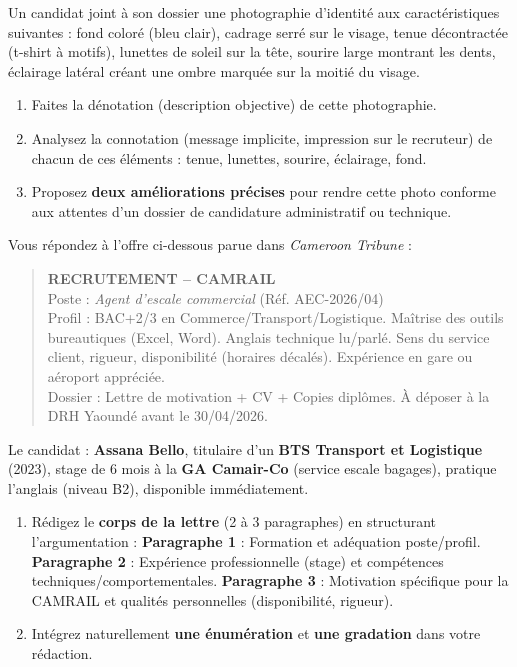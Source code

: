 \documentclass[11pt]{article}
\newcommand{\cle}[1]{{\popxbold\color{popdark}#1}}
\begin{document}
\begin{exercice}
Un candidat joint à son dossier une photographie d'identité aux caractéristiques suivantes : fond coloré (bleu clair), cadrage serré sur le visage, tenue décontractée (t-shirt à motifs), lunettes de soleil sur la tête, sourire large montrant les dents, éclairage latéral créant une ombre marquée sur la moitié du visage.
\begin{enumerate}
    \item Faites la \cle{dénotation} (description objective) de cette photographie.
    \item Analysez la \cle{connotation} (message implicite, impression sur le recruteur) de chacun de ces éléments : tenue, lunettes, sourire, éclairage, fond.
    \item Proposez \textbf{deux améliorations précises} pour rendre cette photo conforme aux attentes d'un dossier de candidature administratif ou technique.
\end{enumerate}
\end{exercice}

\begin{exercice}
Vous répondez à l'offre ci-dessous parue dans \emph{Cameroon Tribune} :
\begin{quote}
\textbf{RECRUTEMENT -- CAMRAIL} \\
Poste : \emph{Agent d'escale commercial} (Réf. AEC-2026/04) \\
Profil : BAC+2/3 en Commerce/Transport/Logistique. Maîtrise des outils bureautiques (Excel, Word). Anglais technique lu/parlé. Sens du service client, rigueur, disponibilité (horaires décalés). Expérience en gare ou aéroport appréciée. \\
Dossier : Lettre de motivation + CV + Copies diplômes. À déposer à la DRH Yaoundé avant le 30/04/2026.
\end{quote}
Le candidat : \textbf{Assana Bello}, titulaire d'un \textbf{BTS Transport et Logistique} (2023), stage de 6 mois à la \textbf{GA Camair-Co} (service escale bagages), pratique l'anglais (niveau B2), disponible immédiatement.
\begin{enumerate}
    \item Rédigez le \textbf{corps de la lettre} (2 à 3 paragraphes) en structurant l'argumentation : \textbf{Paragraphe 1} : Formation et adéquation poste/profil. \textbf{Paragraphe 2} : Expérience professionnelle (stage) et compétences techniques/comportementales. \textbf{Paragraphe 3} : Motivation spécifique pour la CAMRAIL et qualités personnelles (disponibilité, rigueur).
    \item Intégrez naturellement \textbf{une énumération} et \textbf{une gradation} dans votre rédaction.
\end{enumerate}
\end{exercice}
\end{document}
